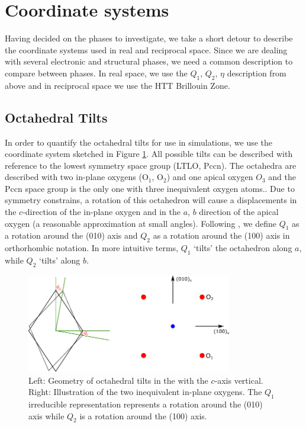 \section{Coordinate systems}
Having decided on the phases to investigate, we take a short detour to describe the coordinate systems used in real and reciprocal space. Since we are dealing with several electronic and structural phases, we need a common description to compare between phases. In real space, we use the $Q_1$, $Q_2$, $\eta$ description from above and in reciprocal space we use the HTT Brillouin Zone.

\subsection{Octahedral Tilts}
In order to quantify the octahedral tilts for use in simulations, we use the coordinate system sketched in Figure \ref{fig:tilt}. All possible tilts can be described with reference to the lowest symmetry space group (LTLO, Pccn). The octahedra are described with two in-plane oxygens (O$_1$, O$_2$) and one apical oxygen $O_3$ and the Pccn space group is the only one with three inequivalent oxygen atoms.. Due to symmetry constrains, a rotation of this octahedron will cause a displacements in the $c$-direction of the in-plane oxygen and in the $a$, $b$ direction of the apical oxygen (a reasonable approximation at small angles). Following \cite{Axe1989}, we define $Q_1$ as a rotation around the (010) axis and $Q_2$ as a rotation around the (100) axis in orthorhombic notation. In more intuitive terms, $Q_1$ `tilts' the octahedron along $a$, while $Q_2$ `tilts' along $b$.

\begin{figure}
	\centering
	\includegraphics[width=0.8\textwidth]{fig/simulation/tilt.pdf}
	\caption[Geometry of octahedral tilts]{Left: Geometry of octahedral tilts in the with the $c$-axis vertical. Right: Illustration of the two inequivalent in-plane oxygens. The $Q_1$ irreducible representation represents a rotation around the (010) axis while $Q_2$ is a rotation around the (100) axis.}
	\label{fig:tilt}
\end{figure}

